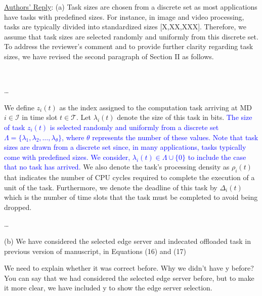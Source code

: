 \documentclass[12pt,draftclsnofoot,onecolumn]{IEEEtran}
\newcommand{\rev}[1]{{\color{blue}#1}} %
\newcommand{\rev}[1]{#1}
\newenvironment{my}[2]%
{\begin{list}{}%
{\setlength{\rightmargin}{#1}\setlength{\leftmargin}{#2}}%


 \item[]{}

} {\end{list}}
\begin{document}
\begin{enumerate}
\underline{Authors' Reply}: (a) Task sizes are chosen from a discrete set as most applications have tasks with predefined sizes. For instance, in image and video processing, tasks are typically divided into standardized sizes [X,XX,XXX]. Therefore, we assume that task sizes are selected randomly and uniformly from this discrete set. To address the reviewer’s comment and to provide further clarity regarding task sizes, we have revised the second paragraph of Section II as follows.


		\begin{my}{1cm}{1cm}
	\rev{
		{\
			
			 \dots

\color{black}
We define $z_i(t)$ as the index assigned to the computation task arriving at MD $i \in \mathcal{I}$ in time slot $t \in \mathcal{T}$. Let $\lambda_i(t)$ denote the size of this task in bits. \textcolor{blue}{The size of task \( z_i(t) \) is selected randomly and uniformly from a discrete set \( \Lambda = \{\lambda_1, \lambda_2, \ldots, \lambda_{\theta}\} \), where \( \theta \) represents the number of these values. Note that task sizes are drawn from a discrete set since, in many applications, tasks typically come with predefined sizes. We consider, $\lambda_i(t) \in \Lambda \cup \{0\}$ to include the case that no task has arrived.} We also denote the task's processing density as $\rho_i(t)$ that indicates the number of CPU cycles required to complete the execution of a unit of the task. Furthermore, we denote the deadline of this task by $\Delta_i(t)$ which is the number of time slots that the task must be completed to avoid being dropped.

\dots




}}
\end{my} \vspace{5mm}

\setcounter{equation}{15}

(b) We have considered the selected edge server and indecated offloaded task in previous version of manuscript, in Equations (16) and (17) 

We need to explain whether it was correct before. Why we didn't have y before? You can say that we had considered the selected edge server before, but to make it more clear, we have included y to show the edge server selection.


\end{enumerate}
\end{document}
